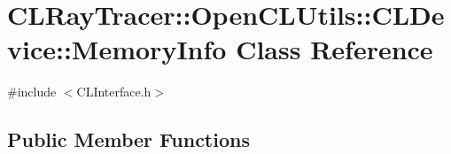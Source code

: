 \hypertarget{class_c_l_ray_tracer_1_1_open_c_l_utils_1_1_c_l_device_1_1_memory_info}{}\section{C\+L\+Ray\+Tracer\+:\+:Open\+C\+L\+Utils\+:\+:C\+L\+Device\+:\+:Memory\+Info Class Reference}
\label{class_c_l_ray_tracer_1_1_open_c_l_utils_1_1_c_l_device_1_1_memory_info}


{\ttfamily \#include $<$C\+L\+Interface.\+h$>$}

\subsection*{Public Member Functions}
